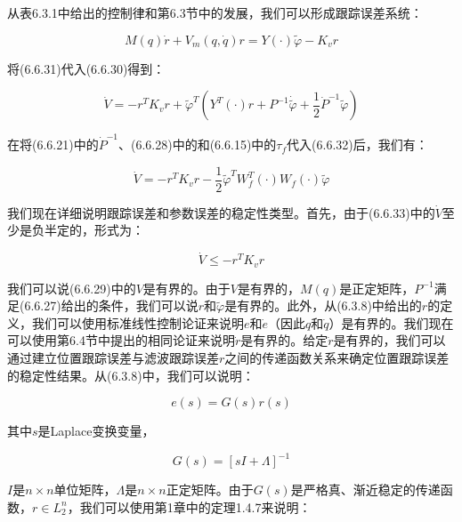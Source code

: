 \documentclass[12pt,a4paper]{ctexart}
\begin{document}
从表6.3.1中给出的控制律和第6.3节中的发展，我们可以形成跟踪误差系统：

\begin{equation}\label{eq:error-composite}
M(q)\dot{r} + V_m(q, \dot{q})r = Y(\cdot)\tilde{\varphi} - K_v r
\end{equation}

将(6.6.31)代入(6.6.30)得到：

\begin{equation}\label{eq:v-subst-composite}
\dot{V} = -r^T K_v r + \tilde{\varphi}^T (Y^T(\cdot)r + P^{-1} \dot{\tilde{\varphi}} + \frac{1}{2}\dot{P}^{-1} \tilde{\varphi})
\end{equation}

在将(6.6.21)中的$\dot{P}^{-1}$、(6.6.28)中的和(6.6.15)中的$\tau_f$代入(6.6.32)后，我们有：

\begin{equation}\label{eq:v-combined-composite}
\dot{V} = -r^T K_v r - \frac{1}{2}\tilde{\varphi}^T W_f^T(\cdot)W_f(\cdot)\tilde{\varphi}
\end{equation}

我们现在详细说明跟踪误差和参数误差的稳定性类型。首先，由于(6.6.33)中的$\dot{V}$至少是负半定的，形式为：

\begin{equation}\label{eq:v-negative-composite}
\dot{V} \leq -r^T K_v r
\end{equation}

我们可以说(6.6.29)中的$V$是有界的。由于$V$是有界的，$M(q)$是正定矩阵，$P^{-1}$满足(6.6.27)给出的条件，我们可以说$r$和$\tilde{\varphi}$是有界的。此外，从(6.3.8)中给出的$r$的定义，我们可以使用标准线性控制论证来说明$e$和$\dot{e}$（因此$q$和$\dot{q}$）是有界的。我们现在可以使用第6.4节中提出的相同论证来说明$\dot{r}$是有界的。给定$\dot{r}$是有界的，我们可以通过建立位置跟踪误差与滤波跟踪误差$r$之间的传递函数关系来确定位置跟踪误差的稳定性结果。从(6.3.8)中，我们可以说明：

\begin{equation}\label{eq:transfer}
e(s) = G(s)r(s)
\end{equation}

其中$s$是Laplace变换变量，

\begin{equation}\label{eq:G-def}
G(s) = [sI + \Lambda]^{-1}
\end{equation}

$I$是$n \times n$单位矩阵，$\Lambda$是$n \times n$正定矩阵。由于$G(s)$是严格真、渐近稳定的传递函数，$r \in L_2^{n}$，我们可以使用第1章中的定理1.4.7来说明：
\end{document}
